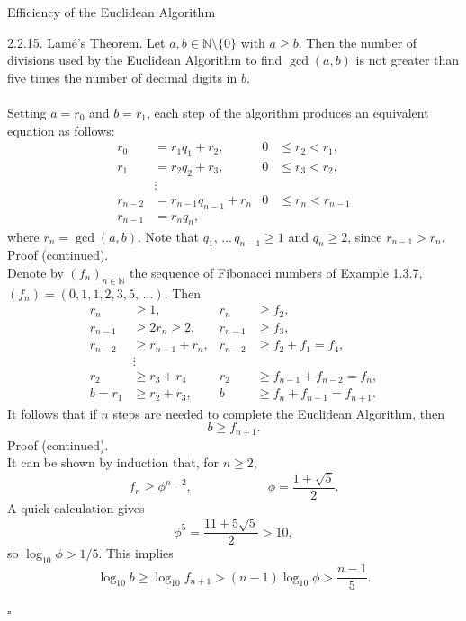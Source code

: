 \documentclass[smaller,hyperref={CJKbookmarks=true}]{beamer}
\newcommand{\N}{\mathbb{N}} \newcommand{\Z}{\mathbb{Z}} \newcommand{\Q}{\mathbb{Q}}
\newenvironment{PROOF}{{\noindent\!\sf\alert{Proof.}}\\}{\hfill$\square$\\}
\newcounter{zhuo}[subsection]
\begin{document}
\begin{frame}{Efficiency of the Euclidean Algorithm}
\begin{spacing}{1.05}
\alert{2.2.15. Lam\'{e}'s Theorem.} Let $a,b\in\N\setminus\{0\}$ with $a\geq b$. Then the number of divisions used by the Euclidean Algorithm to find $\gcd(a,b)$ is not greater than five times the number of decimal digits in $b$.\\[5pt]
\begin{PROOF}
Setting $a=r_0$ and $b=r_1$, each step of the algorithm produces an
equivalent equation as follows:
\begin{align*}
  r_0 &=r_1q_1+r_2,&
  0&\leq r_2<r_1, \\
  r_1 &=r_2q_2+r_3,&
  0&\leq r_3<r_2, \\
    &\vdots \\
  r_{n-2} &=r_{n-1}q_{n-1}+r_n&
  0&\leq r_n<r_{n-1} \\
  r_{n-1} &=r_nq_n,
\end{align*}
where $r_n=\gcd(a,b)$. Note that $q_1,\,...\,q_{n-1}\geq1$ and $q_n\geq2$, since $r_{n-1}>r_n$.
\newpage
\alert{Proof (continued).}\\[3pt]
Denote by $(f_n)_{n\in\N}$ the sequence of Fibonacci numbers of Example 1.3.7, $(f_n)=(0,1,1,2,3,5,\,...)$. Then
\begin{align*}
  r_n &\geq1,& r_n &\geq f_2, \\
  r_{n-1} &\geq2r_n\geq2,& r_{n-1}&\geq f_3, \\
  r_{n-2} &\geq r_{n-1}+r_n,& r_{n-2}&\geq f_2+f_1=f_4, \\
   &\vdots &  \\
  r_2 &\geq r_3+r_4 & r_2&\geq f_{n-1}+f_{n-2}=f_n, \\
  b=r_1 &\geq r_2+r_3, & b &\geq f_n+f_{n-1}=f_{n+1}.
\end{align*}
It follows that if $n$ steps are needed to complete the Euclidean Algorithm,
then
\[b\geq f_{n+1}.\]
\newpage
\vspace*{7pt}
\alert{Proof (continued).}\\
It can be shown by induction that, for $n\geq2$,
\begin{equation}\label{2.2.3}
f_n\geq\phi^{n-2},\qquad\qquad\qquad
\phi=\frac{1+\sqrt{5}}{2}.
\end{equation}
A quick calculation gives
\[\phi^5=\frac{11+5\sqrt{5}}{2}>10,\]
so $\log_{10}\phi>1/5$. This implies
\[\log_{10}b\geq\log_{10}f_{n+1}>(n-1)\log_{10}
\phi>\frac{n-1}{5}.\]
\newpage

\end{PROOF}
\end{spacing}
\end{frame}
\end{document}
